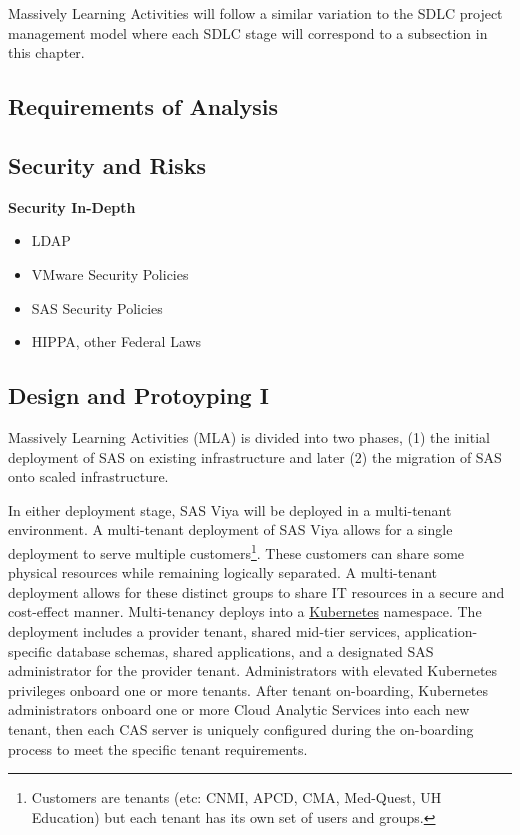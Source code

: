 Massively Learning Activities will follow a similar variation to the SDLC project management model where each SDLC stage will correspond to a subsection in this chapter. 

\subsection{Requirements of Analysis}


\subsection{Security and Risks}
\textbf{Security In-Depth}
\begin{itemize}
    \item LDAP
    \item VMware Security Policies
    \item SAS Security Policies
    \item HIPPA, other Federal Laws
\end{itemize}

\subsection{Design and Protoyping I}
Massively Learning Activities (MLA) is divided into two phases, (1) the initial deployment of SAS on existing infrastructure and later (2) the migration of SAS onto scaled infrastructure. 

In either deployment stage, SAS Viya will be deployed in a multi-tenant environment. A multi-tenant deployment of SAS Viya allows for a single deployment to serve multiple customers\footnote{Customers are tenants (etc: CNMI, APCD, CMA, Med-Quest, UH Education) but each tenant has its own set of users and groups.}. These customers can share some physical resources while remaining logically separated. A multi-tenant deployment allows for these distinct groups to share IT resources in a secure and cost-effect manner. Multi-tenancy deploys into a \href{https://kubernetes.io/}{Kubernetes} namespace. The deployment includes a provider tenant, shared mid-tier services, application-specific database schemas, shared applications, and a designated SAS administrator for the provider tenant. Administrators with elevated Kubernetes privileges onboard one or more tenants. After tenant on-boarding, Kubernetes administrators onboard one or more Cloud Analytic Services into each new tenant, then each CAS server is uniquely configured during the on-boarding process to meet the specific tenant requirements. 

